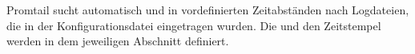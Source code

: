 Promtail sucht automatisch und in vordefinierten Zeitabständen nach Logdateien, die in der Konfigurationsdatei eingetragen wurden. Die  und den Zeitstempel werden in dem jeweiligen Abschnitt definiert.






